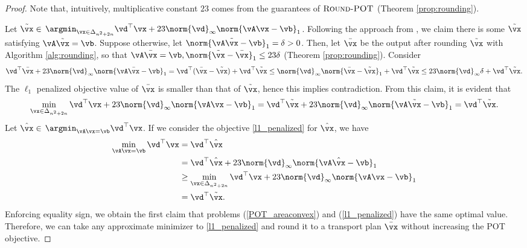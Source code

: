 \begin{proof}
    Note that, intuitively, multiplicative constant $23$ comes from the guarantees of  $\textsc{Round-POT}$ (Theorem \ref{prop:rounding}). 
    
    Let $\tilde{\vx} \in$ $\argmin_{\vx \in \Delta_{n^2+2n}} \vd^\top \vx + 23 \norm{\vd}_\infty \norm{\vA \vx - \vb}_1$. Following the approach from \citep[Lemma 1]{Jambulapati-2019-Direct}, we claim there is some $\tilde{\vx}$ satisfying $\vA\tilde{\vx} = \vb$. Suppose otherwise, let $\norm{\vA\tilde{\vx} - \vb}_1 = \delta > 0$. Then, let $\bar{\vx}$ be the output after rounding $\tilde{\vx}$ with Algorithm \ref{alg:rounding}, so that $\vA\bar{\vx} = \vb, \norm{\tilde{\vx} - \bar{\vx}}_1 \leq 23\delta$ (Theorem \ref{prop:rounding}). Consider
	\begin{equation*}
	\vd^\top \bar{\vx} + 23 \norm{\vd}_\infty \norm{\vA\bar{\vx} - \vb}_1 = \vd^\top(\bar{\vx} - \tilde{\vx}) + \vd^\top \tilde{\vx} \leq \norm{\vd}_\infty \norm{\bar{\vx} - \tilde{\vx}}_1 + \vd^\top \tilde{\vx} \leq 23\norm{\vd}_\infty\delta + \vd^\top \tilde{\vx}.
	\end{equation*}
	The $\ell_1$ penalized objective value of $\bar{\vx}$ is smaller than that of $\tilde{\vx}$, hence this implies contradiction. From this claim, it is evident that 
	\begin{equation*}
	    \min_{\vx \in \Delta_{n^2+2n}} \vd^\top \vx + 23 \norm{\vd}_\infty \norm{\vA \vx - \vb}_1 = \vd^\top \tilde{\vx} + 23 \norm{\vd}_\infty \norm{\vA \tilde{\vx} - \vb}_1 = \vd^\top \tilde{\vx}. %
	\end{equation*}
	Let $\hat{\vx} \in$ $\argmin_{\vA \vx = \vb} \vd^\top \vx$. If we consider the objective \eqref{l1_penalized} for $\hat{\vx}$, we have
	\begin{align*}
	     \min_{\vA \vx = \vb} \vd^\top \vx &= \vd^\top \hat{\vx}\\ 
	     &= \vd^\top \hat{\vx} + 23 \norm{\vd}_\infty \norm{\vA \hat{\vx} - \vb}_1 \\
	     &\geq \min_{\vx \in \Delta_{n^2+2n}} \vd^\top \vx + 23 \norm{\vd}_\infty \norm{\vA \vx - \vb}_1 \\
	     &= \vd^\top \tilde{\vx}.
	\end{align*}
	Enforcing equality sign, we obtain the first claim that problems (\ref{POT_areaconvex}) and (\ref{l1_penalized}) have the same optimal value. Therefore, we can take any approximate minimizer to \eqref{l1_penalized} and round it to a transport plan $\bar{\vx}$ without increasing the POT objective.
\end{proof}
